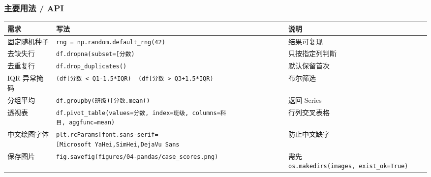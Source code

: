 \subsubsection{主要用法 / API}\label{ux4e3bux8981ux7528ux6cd5-api-20}

{\def\LTcaptype{none} %
\begin{longtable}[]{@{}
  >{\raggedright\arraybackslash}p{}
  >{\raggedright\arraybackslash}p{}
  >{\raggedright\arraybackslash}p{}@{}}
\toprule\noalign{}
\begin{minipage}[b]{\linewidth}\raggedright
需求
\end{minipage} & \begin{minipage}[b]{\linewidth}\raggedright
写法
\end{minipage} & \begin{minipage}[b]{\linewidth}\raggedright
说明
\end{minipage} \\
\midrule\noalign{}
\endhead
\bottomrule\noalign{}
\endlastfoot
固定随机种子 & \texttt{rng\ =\ np.random.default\_rng(42)} &
结果可复现 \\
去缺失行 &
\texttt{df.dropna(subset={[}\textquotesingle{}分数\textquotesingle{}{]})}
& 只按指定列判断 \\
去重复行 & \texttt{df.drop\_duplicates()} & 默认保留首次 \\
IQR 异常掩码 &
\texttt{(df{[}\textquotesingle{}分数\textquotesingle{}{]}\ \textless{}\ Q1-1.5*IQR)\ \textbar{}\ (df{[}\textquotesingle{}分数\textquotesingle{}{]}\ \textgreater{}\ Q3+1.5*IQR)}
& 布尔筛选 \\
分组平均 &
\texttt{df.groupby(\textquotesingle{}班级\textquotesingle{}){[}\textquotesingle{}分数\textquotesingle{}{]}.mean()}
& 返回 Series \\
透视表 &
\texttt{df.pivot\_table(values=\textquotesingle{}分数\textquotesingle{},\ index=\textquotesingle{}班级\textquotesingle{},\ columns=\textquotesingle{}科目\textquotesingle{},\ aggfunc=\textquotesingle{}mean\textquotesingle{})}
& 行列交叉表格 \\
中文绘图字体 &
\texttt{plt.rcParams{[}\textquotesingle{}font.sans-serif\textquotesingle{}{]}={[}\textquotesingle{}Microsoft\ YaHei\textquotesingle{},\textquotesingle{}SimHei\textquotesingle{},\textquotesingle{}DejaVu\ Sans\textquotesingle{}{]}}
& 防止中文缺字 \\
保存图片 &
\texttt{fig.savefig(\textquotesingle{}figures/04-pandas/case\_scores.png\textquotesingle{})}
& 需先
\texttt{os.makedirs(\textquotesingle{}images\textquotesingle{},\ exist\_ok=True)} \\
\end{longtable}
}

